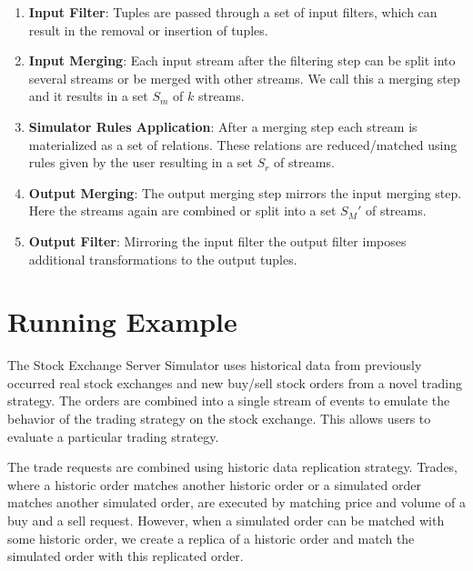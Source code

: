\documentclass{article}
\begin{document}
\begin{enumerate}
    \item {\bf Input Filter}: Tuples are passed through a set of input filters, which can result in the removal or insertion of tuples. 
    \item {\bf Input Merging}: Each input stream after the filtering step can be split into several streams or be merged with other streams. We call this a merging step and it results in a set $S_m$ of $k$ streams. 
    \item {\bf Simulator Rules Application}: After a merging step each stream is materialized as a set of relations. These relations are reduced/matched using rules given by the user resulting in a set $S_r$ of streams.
    \item {\bf Output Merging}: The output merging step mirrors the input merging step. Here the streams again are combined or split into a set $S_M '$ of streams. 
    \item {\bf Output Filter}: Mirroring the input filter the output filter imposes additional transformations to the output tuples.
\end{enumerate}



\section{Running Example}

The Stock Exchange Server Simulator uses historical data from previously occurred real stock exchanges and new  buy/sell stock orders from a novel trading strategy. The orders are combined into a single stream of events to emulate the behavior of the trading strategy on the stock exchange. This allows users to evaluate a particular trading strategy. 

The trade requests are combined using historic data replication strategy. Trades, where a historic order matches another historic order or a simulated order matches another simulated order, are executed by matching price and volume of a buy and a sell request. However, when a simulated order can be matched with some historic order, we create a replica of a historic order and match the simulated order with this replicated order.
\end{document}
